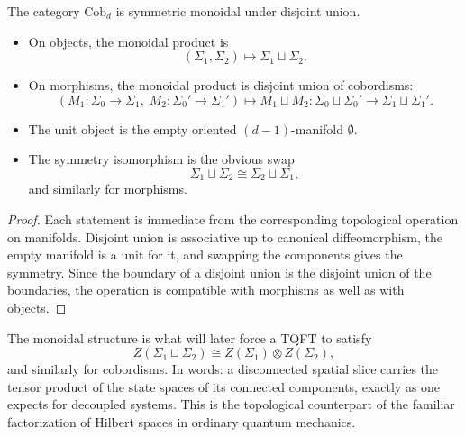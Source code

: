 \begin{proposition}\label{prop:Cobd-monoidal}
The category $\mathrm{Cob}_d$ is symmetric monoidal under disjoint union.
\begin{itemize}
\item On objects, the monoidal product is
\begin{equation*}
(\Sigma_1,\Sigma_2) \longmapsto \Sigma_1 \sqcup \Sigma_2.
\end{equation*}
\item On morphisms, the monoidal product is disjoint union of cobordisms:
\begin{equation*}
(M_1 : \Sigma_0 \to \Sigma_1,\; M_2 : \Sigma_0' \to \Sigma_1')
\longmapsto
M_1 \sqcup M_2 : \Sigma_0 \sqcup \Sigma_0' \to \Sigma_1 \sqcup \Sigma_1'.
\end{equation*}
\item The unit object is the empty oriented $(d-1)$-manifold $\emptyset$.
\item The symmetry isomorphism is the obvious swap
\begin{equation*}
\Sigma_1 \sqcup \Sigma_2 \cong \Sigma_2 \sqcup \Sigma_1,
\end{equation*}
and similarly for morphisms.
\end{itemize}
\end{proposition}

\begin{proof}
Each statement is immediate from the corresponding topological operation on manifolds. Disjoint union is associative up to canonical diffeomorphism, the empty manifold is a unit for it, and swapping the components gives the symmetry. Since the boundary of a disjoint union is the disjoint union of the boundaries, the operation is compatible with morphisms as well as with objects.
\end{proof}

\begin{remark}\label{rem:disjoint-union-physics}
The monoidal structure is what will later force a TQFT to satisfy
\begin{equation*}
Z(\Sigma_1 \sqcup \Sigma_2) \cong Z(\Sigma_1) \otimes Z(\Sigma_2),
\end{equation*}
and similarly for cobordisms. In words: a disconnected spatial slice carries the tensor product of the state spaces of its connected components, exactly as one expects for decoupled systems. This is the topological counterpart of the familiar factorization of Hilbert spaces in ordinary quantum mechanics.
\end{remark}

